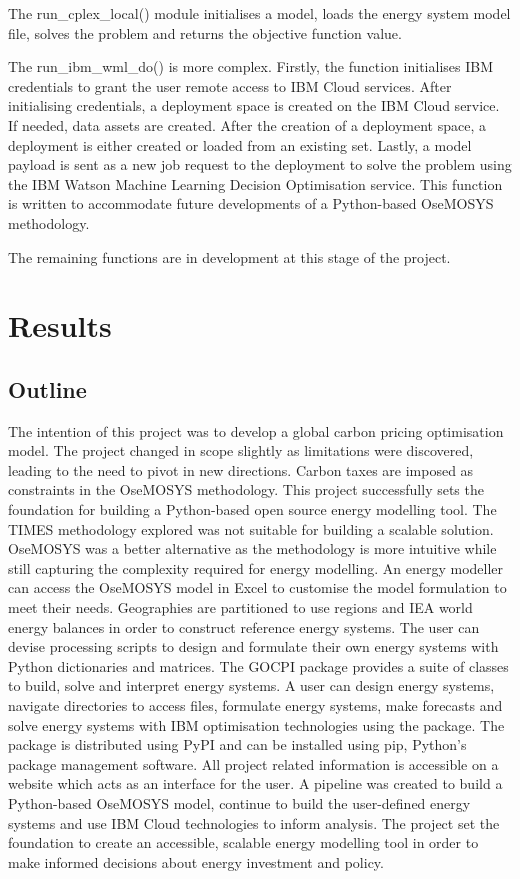 \documentclass[12pt]{article}
\begin{document}
The run\_cplex\_local() module initialises a model, loads the energy system model file, solves the problem and returns the objective function value.

The run\_ibm\_wml\_do() is more complex.
Firstly, the function initialises IBM credentials to grant the user remote access to IBM Cloud services.
After initialising credentials, a deployment space is created on the IBM Cloud service.
If needed, data assets are created.
After the creation of a deployment space, a deployment is either created or loaded from an existing set.
Lastly, a model payload is sent as a new job request to the deployment to solve the problem using the IBM Watson Machine Learning Decision Optimisation service.
This function is written to accommodate future developments of a Python-based OseMOSYS methodology.

The remaining functions are in development at this stage of the project.
\newpage
\section{Results}
\subsection{Outline}
The intention of this project was to develop a global carbon pricing optimisation model.
The project changed in scope slightly as limitations were discovered, leading to the need to pivot in new directions.
Carbon taxes are imposed as constraints in the OseMOSYS methodology.
This project successfully sets the foundation for building a Python-based open source energy modelling tool.
The TIMES methodology explored was not suitable for building a scalable solution.
OseMOSYS was a better alternative as the methodology is more intuitive while still capturing the complexity required for energy modelling.
An energy modeller can access the OseMOSYS model in Excel to customise the model formulation to meet their needs.
Geographies are partitioned to use regions and IEA world energy balances in order to construct reference energy systems.
The user can devise processing scripts to design and formulate their own energy systems with Python dictionaries and matrices.
The GOCPI package provides a suite of classes to build, solve and interpret energy systems.
A user can design energy systems, navigate directories to access files, formulate energy systems, make forecasts and solve energy systems with IBM optimisation technologies using the package.
The package is distributed using PyPI and can be installed using pip, Python's package management software.
All project related information is accessible on a website which acts as an interface for the user.
A pipeline was created to build a Python-based OseMOSYS model, continue to build the user-defined energy systems and use IBM Cloud technologies to inform analysis.
The project set the foundation to create an accessible, scalable energy modelling tool in order to make informed decisions about energy investment and policy.
\end{document}
